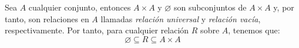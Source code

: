 
    
\noindent    Sea $A$ cualquier conjunto, entonces $A \times A$ y $\varnothing$ son subconjuntos de $A \times A$ y, por tanto, son relaciones en $A$ llamadas \textit{relación universal} y \textit{relación vacía}, respectivamente. Por tanto, para cualquier relación $R$ sobre $A$, tenemos que:
\[
\varnothing \subseteq R \subseteq A \times A
\]